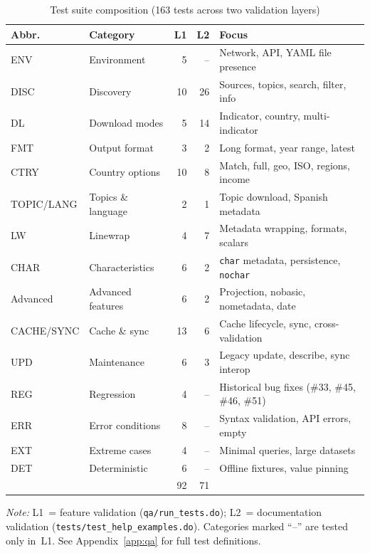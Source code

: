 \documentclass[bib]{statapress}
\newcommand{\floatnote}[2][\linewidth]{%
  \par\smallskip
  \begin{minipage}{#1}
    \small\raggedright #2
  \end{minipage}
}
\begin{document}
\begin{table}[htbp]
\centering
\caption{Test suite composition (163 tests across two validation layers)}
\label{tab:test-coverage}
\footnotesize
\begin{tabular}{@{}llrrl@{}}
\hline
Abbr. & Category & L1 & L2 & Focus \\
\hline
ENV        & Environment       & 5  & -- & Network, API, YAML file presence \\
DISC       & Discovery         & 10 & 26 & Sources, topics, search, filter, info \\
DL         & Download modes    & 5  & 14 & Indicator, country, multi-indicator \\
FMT        & Output format     & 3  & 2  & Long format, year range, latest \\
CTRY       & Country options   & 10 & 8  & Match, full, geo, ISO, regions, income \\
TOPIC/LANG & Topics \& language & 2  & 1  & Topic download, Spanish metadata \\
LW         & Linewrap          & 4  & 7  & Metadata wrapping, formats, scalars \\
CHAR       & Characteristics   & 6  & 2  & \texttt{char} metadata, persistence, \texttt{nochar} \\
Advanced   & Advanced features & 6  & 2  & Projection, nobasic, nometadata, date \\
CACHE/SYNC & Cache \& sync     & 13 & 6  & Cache lifecycle, sync, cross-validation \\
UPD        & Maintenance       & 6  & 3  & Legacy update, describe, sync interop \\
REG        & Regression        & 4  & -- & Historical bug fixes (\#33, \#45, \#46, \#51) \\
ERR        & Error conditions  & 8  & -- & Syntax validation, API errors, empty \\
EXT        & Extreme cases     & 4  & -- & Minimal queries, large datasets \\
DET        & Deterministic     & 6  & -- & Offline fixtures, value pinning \\
\hline
           &                   & 92 & 71 & \\
\hline
\end{tabular}

\floatnote{\emph{Note:} L1~= feature validation (\texttt{qa/run\_tests.do});
L2~= documentation validation (\texttt{tests/test\_help\_examples.do}).
Categories marked ``--'' are tested only in~L1.
See Appendix~\ref{app:qa} for full test definitions.}

\end{table}
\end{document}
